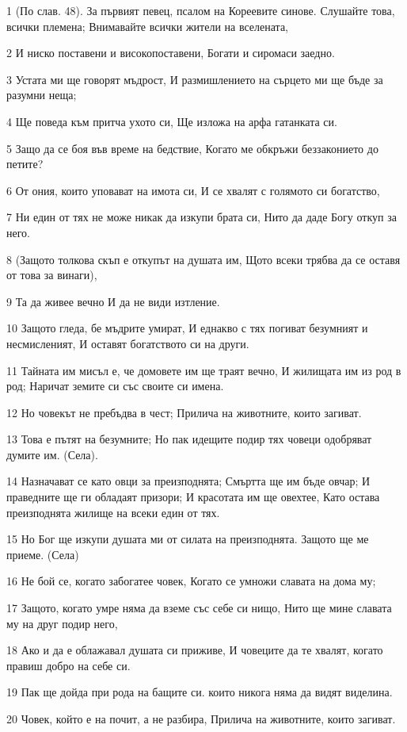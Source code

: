 \par 1 (По слав. 48). За първият певец, псалом на Кореевите синове. Слушайте това, всички племена; Внимавайте всички жители на вселената,
\par 2 И ниско поставени и високопоставени, Богати и сиромаси заедно.
\par 3 Устата ми ще говорят мъдрост, И размишлението на сърцето ми ще бъде за разумни неща;
\par 4 Ще поведа към притча ухото си, Ще изложа на арфа гатанката си.
\par 5 Защо да се боя във време на бедствие, Когато ме обкръжи беззаконието до петите?
\par 6 От ония, които уповават на имота си, И се хвалят с голямото си богатство,
\par 7 Ни един от тях не може никак да изкупи брата си, Нито да даде Богу откуп за него.
\par 8 (Защото толкова скъп е откупът на душата им, Щото всеки трябва да се оставя от това за винаги),
\par 9 Та да живее вечно И да не види изтление.
\par 10 Защото гледа, бе мъдрите умират, И еднакво с тях погиват безумният и несмисленият, И оставят богатството си на други.
\par 11 Тайната им мисъл е, че домовете им ще траят вечно, И жилищата им из род в род; Наричат земите си със своите си имена.
\par 12 Но човекът не пребъдва в чест; Прилича на животните, които загиват.
\par 13 Това е пътят на безумните; Но пак идещите подир тях човеци одобряват думите им. (Села).
\par 14 Назначават се като овци за преизподнята; Смъртта ще им бъде овчар; И праведните ще ги обладаят призори; И красотата им ще овехтее, Като остава преизподнята жилище на всеки един от тях.
\par 15 Но Бог ще изкупи душата ми от силата на преизподнята. Защото ще ме приеме. (Села)
\par 16 Не бой се, когато забогатее човек, Когато се умножи славата на дома му;
\par 17 Защото, когато умре няма да вземе със себе си нищо, Нито ще мине славата му на друг подир него,
\par 18 Ако и да е облажавал душата си приживе, И човеците да те хвалят, когато правиш добро на себе си.
\par 19 Пак ще дойда при рода на бащите си. които никога няма да видят виделина.
\par 20 Човек, който е на почит, а не разбира, Прилича на животните, които загиват.


